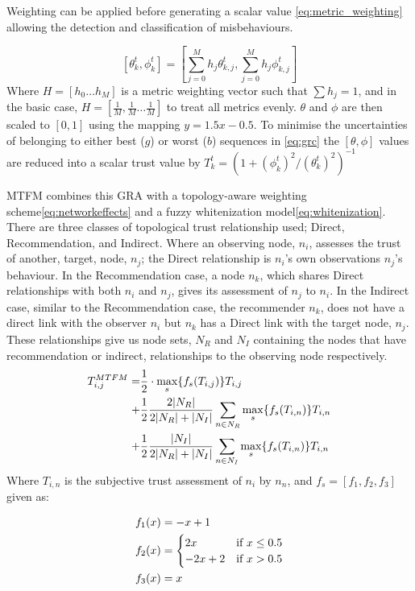 \documentclass[conference]{IEEEtran}
\begin{document}
Weighting can be applied before generating a scalar value \eqref{eq:metric_weighting} allowing the detection and classification of misbehaviours.

%
\begin{equation}
  \label{eq:metric_weighting}
  [\theta_k^t, \phi_k^t] = \left[\sum_{j=0}^M h_j \theta_{k,j}^t,\sum_{j=0}^M h_j \phi_{k,j}^t \right]
\end{equation}
%
Where $H=[h_0\dots h_M]$ is a metric weighting vector such that $\sum h_j = 1$, and in the basic case, $H=[\frac{1}{M},\frac{1}{M}\dots\frac{1}{M}]$ to treat all metrics evenly.
$\theta$ and $\phi$ are then scaled to $[0,1]$ using the mapping $y = 1.5 x - 0.5$.
To minimise the uncertainties of belonging to either best ($g$) or worst ($b$) sequences in \eqref{eq:grc} the $[\theta,\phi]$ values are reduced into a scalar trust value by $T_k^t = ({1+{(\phi_k^t)^2}/{(\theta_k^t)^2}})^{-1}$\cite{Hong2010}

MTFM combines this GRA with a topology-aware weighting scheme\eqref{eq:networkeffects} and a fuzzy whitenization model\eqref{eq:whitenization}. There are three classes of topological trust relationship used; Direct, Recommendation, and Indirect.
Where an observing node, $n_i$, assesses the trust of another, target, node, $n_j$; the Direct relationship is $n_i$'s own observations $n_j$'s behaviour.
In the Recommendation case, a node $n_k$, which shares Direct relationships with both $n_i$ and $n_j$, gives its assessment of $n_j$ to $n_i$.
In the Indirect case, similar to the Recommendation case, the recommender $n_k$, does not have a direct link with the observer $n_i$ but $n_k$ has a Direct link with the target node, $n_j$.
These relationships give us node sets, $N_R$ and $N_I$ containing the nodes that have recommendation or indirect, relationships to the observing node respectively.
%
\begin{align}
  \label{eq:networkeffects}
  T_{i,j}^{MTFM}=&\frac{1}{2} \cdot \max_s\{f_s(T_{i,j})\} T_{i,j}\\ \notag
  +&\frac{1}{2} \frac{2|N_R| }{2|N_R| + |N_I|}\sum_{n \in N_R} \max_s\{f_s(T_{i,n})\} T_{i,n}\\ \notag
  +&\frac{1}{2} \frac{|N_I| }{2|N_R| + |N_I|}\sum_{n \in N_I} \max_s\{f_s(T_{i,n})\} T_{i,n} 
\end{align}
Where $T_{i,n}$ is the subjective trust assessment of $n_i$ by $n_n$, and $f_s = [ f_1,f_2, f_3]$ given as:


\begin{align}
  \label{eq:whitenization}
  f_1(x)&= -x+1\notag\\
  f_2(x)&= 
  \begin{cases}
    2x & \text{if }x\leq 0.5\\
    -2x+2 & \text{if }x>0.5
  \end{cases}\\
  f_3(x)&= x\notag
\end{align}
%
\end{document}
